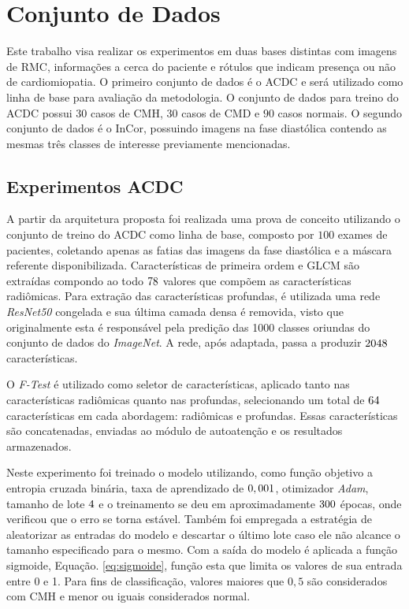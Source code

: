 \section{Conjunto de Dados} 
\label{subsec:cap5_dataset}

Este trabalho visa realizar os experimentos em duas bases distintas com imagens de \gls{RMC}, informações a cerca do paciente e rótulos que indicam presença ou não de cardiomiopatia. O primeiro conjunto de dados é o \gls{ACDC} e será utilizado como linha de base para avaliação da metodologia. O conjunto de dados para treino do \gls{ACDC} possui $30$ casos de \gls{CMH}, $30$ casos de \gls{CMD} e $90$ casos normais. O segundo conjunto de dados é o \gls{InCor}, possuindo imagens na fase diastólica contendo as mesmas três classes de interesse previamente mencionadas.

\subsection{Experimentos ACDC}
\label{subsec:cap5_experimentos_acdc}

A partir da arquitetura proposta foi realizada uma prova de conceito utilizando o conjunto de treino do \gls{ACDC} como linha de base, composto por $100$ exames de pacientes, coletando apenas as fatias das imagens da fase diastólica e a máscara referente disponibilizada. Características de primeira ordem e \gls{GLCM} são extraídas compondo ao todo $78$ valores que compõem as características radiômicas. Para extração das características profundas, é utilizada uma rede \textit{ResNet50} congelada e sua última camada densa é removida, visto que originalmente esta é responsável pela predição das 1000 classes oriundas do conjunto de dados do \textit{ImageNet}. A rede, após adaptada, passa a produzir $2048$ características.

O \textit{F-Test} é utilizado como seletor de características, aplicado tanto nas características radiômicas quanto nas profundas, selecionando um total de $64$ características em cada abordagem: radiômicas e profundas. Essas características são concatenadas, enviadas ao módulo de autoatenção e os resultados armazenados.

Neste experimento foi treinado o modelo utilizando, como função objetivo a entropia cruzada binária, taxa de aprendizado de $0,001$, otimizador \textit{Adam}, tamanho de lote $4$ e o treinamento se deu em aproximadamente $300$ épocas, onde verificou que o erro se torna estável. Também foi empregada a estratégia de aleatorizar as entradas do modelo e descartar o último lote caso ele não alcance o tamanho especificado para o mesmo. Com a saída do modelo é aplicada a função sigmoide, Equação. \ref{eq:sigmoide}, função esta que limita os valores de sua entrada entre 0 e 1. Para fins de classificação, valores maiores que $0,5$ são considerados com \gls{CMH} e menor ou iguais considerados normal.

